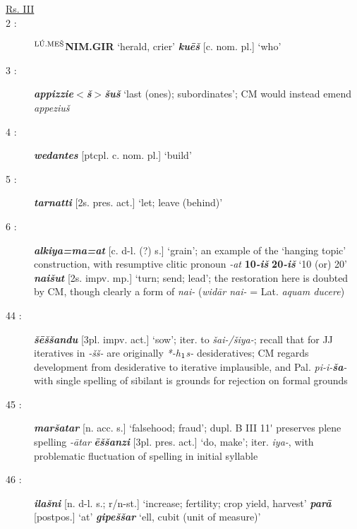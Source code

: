 \documentclass[10pt]{article}
\newcommand{\supersc}[1]{$^{\textrm{\scriptsize{#1}}}$}  	%
\newcommand{\subsc}[1]{$_{\textrm{\scriptsize{#1}}}$}	%
\newcommand{\bit}[1]{\textbf{\textit{#1}}}				%
\newcommand{\p}[1]{{\tiny[{#1}]}}					%
\newcommand{\hi}{h\subsc{1}}								%
\newcommand{\pr}{\'{ }}									%
\newcommand{\hith}{\textsubwedge{h}}
\newcommand{\men}{\supersc{L\'U.ME\v{S}}}
\renewcommand{\.}[1]{\textsubdot{#1}}
\begin{document}
\begin{description}

\smallskip

\item[\underline{Rs. III}]

\smallskip

\item[2 :] \textbf{{\men}NIM.GIR} `herald, crier' \bit{ku\=e\v{s}} \p{c. nom. pl.} `who'

\item[3 :] \bit{appizzie$<$\v{s}$>$\v{s}u\v{s}} `last (ones); subordinates'; CM would instead emend \textit{appeziu\v{s}}

\item[4 :] \bit{wedantes} \p{ptcpl. c. nom. pl.} `build'

\item[5 :] \bit{tarnatti} \p{2s. pres. act.} `let; leave (behind)' 

\item[6 :] \bit{{\hith}alkiya=ma=at} \p{c. d-l. (?) s.} `grain'; an example of the `hanging topic' construction, with resumptive clitic pronoun \textit{-at}  \textbf{10}\bit{-i\v{s}} \textbf{20}\bit{-i\v{s}} `10 (or) 20' \bit{nai\v{s}{\hith}ut} \p{2s. impv. mp.} `turn; send; lead'; the restoration here is doubted by CM, though clearly a form of \textit{nai-} (\textit{wid\=ar nai-} = Lat. \textit{aquam ducere})

\item[44 :] \bit{\v{s}\=e\v{s}\v{s}andu} \p{3pl. impv. act.} `sow'; iter. to \textit{\v{s}ai-/\v{s}iya-}; recall that for JJ iteratives in \textit{-\v{s}\v{s}-} are originally \textit{*-{\hi}s-} desideratives; CM regards development from desiderative to iterative implausible, and Pal. \textit{pi-i-\textbf{\v{s}a}-} with single spelling of sibilant is grounds for rejection on formal grounds

\item[45 :] \bit{mar\v{s}atar} \p{n. acc. s.} `falsehood; fraud'; dupl. B III 11{\pr} preserves plene spelling \textit{-\=atar} \bit{\=e\v{s}\v{s}anzi} \p{3pl. pres. act.} `do, make'; iter. \textit{iya-}, with problematic fluctuation of spelling in initial syllable

\item[46 :] \bit{ila\v{s}ni} \p{n. d-l. s.; r/n-st.} `increase; fertility; crop yield, harvest' \bit{par\=a} \p{postpos.} `at' \bit{gipe\v{s}\v{s}ar} `ell, cubit (unit of measure)'


\end{description}
\end{document}
